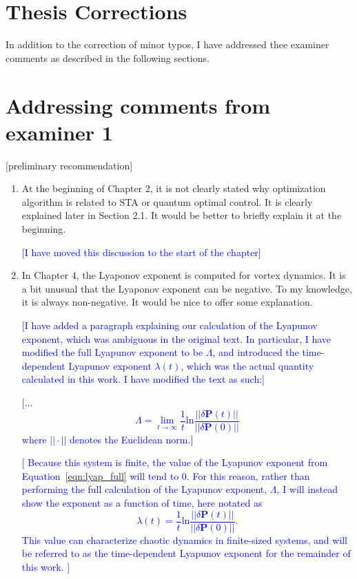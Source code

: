 \documentclass[11pt]{article}
\begin{document}
\newcommand{\jrs}[1]{\textcolor{blue}{[#1]}}

\section*{Thesis Corrections}

In addition to the correction of minor typos, I have addressed thee examiner comments as described in the following sections.

\section{Addressing comments from examiner 1}
[preliminary recommendation]

\begin{enumerate}
\item At the beginning of Chapter 2, it is not clearly stated why optimization algorithm is related to STA or quantum optimal control. It is clearly explained later in Section 2.1. It would be better to briefly explain it at the beginning.

\jrs{I have moved this discussion to the start of the chapter}

\item In Chapter 4, the Lyaponov exponent is computed for vortex dynamics. It is a bit unusual that the Lyaponov exponent can be negative. To my knowledge, it is always non-negative. It would be nice to offer some explanation.

\jrs{I have added a paragraph explaining our calculation of the Lyapunov exponent, which was ambiguous in the original text.
In particular, I have modified the full Lyapunov exponent to be $\Lambda$, and introduced the time-dependent Lyapunov exponent $\lambda(t)$, which was the actual quantity calculated in this work.
I have modified the text as such:}

\jrs{...
\begin{equation}
\Lambda = \lim_{t\to\infty}\frac{1}{t}\text{ln}\frac{||\delta\textbf{P}(t)||}{||\delta\textbf{P}(0)||}
\label{eqn:lyap_full}
\end{equation}
where $||\cdot||$ denotes the Euclidean norm.}

\jrs{
Because this system is finite, the value of the Lyapunov exponent from Equation~\eqref{eqn:lyap_full} will tend to 0.
For this reason, rather than performing the full calculation of the Lyapunov exponent, $\Lambda$, I will instead show the exponent as a function of time, here notated as
\begin{equation}
\lambda(t) = \frac{1}{t}\text{ln}\frac{||\delta\textbf{P}(t)||}{||\delta\textbf{P}(0)||}.
\label{eqn:lyap}
\end{equation}
\noindent This value can characterize chaotic dynamics in finite-sized systems, and will be referred to as the time-dependent Lyapunov exponent for the remainder of this work.
}


\end{enumerate}
\end{document}

